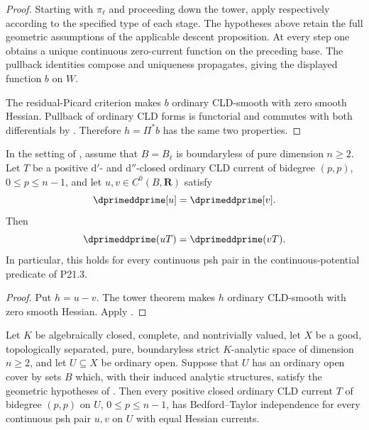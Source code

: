 \begin{proof}
Starting with \(\pi_\ell\) and proceeding down the tower, apply respectively
according to the specified type of each stage.  The hypotheses above retain
the full geometric assumptions of the applicable descent proposition.  At
every step one obtains a unique continuous zero-current function on the
preceding base.  The pullback identities compose and uniqueness propagates,
giving the displayed function \(b\) on \(W\).

The residual-Picard criterion
 makes \(b\) ordinary
CLD-smooth with zero smooth Hessian.  Pullback of ordinary CLD forms is
functorial and commutes with both differentials by
.  Therefore \(h=\Pi^*b\) has the same two
properties.
\end{proof}

\begin{corollary}
\label{cor:p213-residual-picard-mixed-tower-bt}
In the setting of , assume that
\(B=B_\ell\) is boundaryless of pure dimension \(n\geq2\).  Let \(T\) be a
positive \(\mathrm d'\)- and \(\mathrm d''\)-closed ordinary CLD current of
bidegree \((p,p)\), \(0\leq p\leq n-1\), and let
\(u,v\in C^0(B,\mathbf R)\) satisfy
\[
                         \dprimeddprime[u]=\dprimeddprime[v].
\]
Then
\[
                         \dprimeddprime(uT)=\dprimeddprime(vT).
\]
In particular, this holds for every continuous psh pair in the
continuous-potential predicate of P21.3.
\end{corollary}

\begin{proof}
Put \(h=u-v\).  The tower theorem makes \(h\) ordinary CLD-smooth with
zero smooth Hessian.  Apply .
\end{proof}

\begin{corollary}
\label{cor:p213-residual-picard-mixed-tower-cover-bt}
Let \(K\) be algebraically closed, complete, and nontrivially valued, let
\(X\) be a good, topologically separated, pure, boundaryless strict
\(K\)-analytic space of dimension \(n\geq2\), and let \(U\subseteq X\) be
ordinary open.  Suppose that \(U\) has an ordinary open cover by sets \(B\)
which, with their induced analytic structures, satisfy the geometric
hypotheses of .  Then every
positive closed ordinary CLD current \(T\) of bidegree \((p,p)\) on \(U\),
\(0\leq p\leq n-1\), has Bedford--Taylor independence for every continuous
psh pair \(u,v\) on \(U\) with equal Hessian currents.
\end{corollary}

